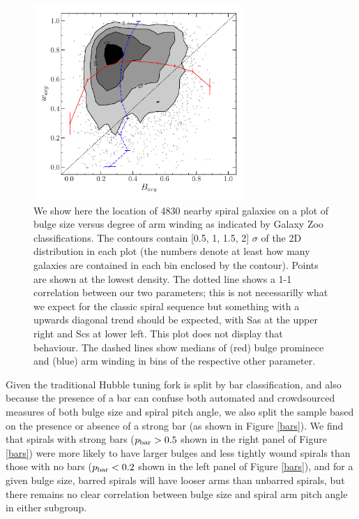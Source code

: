 \documentclass[usenatbib]{mn2e}
\begin{document}
 
 \begin{figure}
\includegraphics[width=80mm]{bulge_armwinding_rolling_median.pdf}
\caption{We show here the location of {4830} nearby spiral galaxies on a plot of bulge size versus degree of arm winding as indicated by Galaxy Zoo classifications. The contours contain [0.5, 1, 1.5, 2] $\sigma$ of the 2D distribution in each plot (the numbers denote at least how many galaxies are contained in each bin enclosed by the contour). Points are shown at the lowest density.  The dotted line shows a 1-1 correlation between our two parameters; this is not necessarilly what we expect for the classic spiral sequence but something with a upwards diagonal trend should be expected, with Sas at the upper right and Scs at lower left. This plot does not display that behaviour. The dashed lines show medians of (red) bulge prominece and (blue) arm winding in bins of the respective other parameter.  \label{bulgewinding}}
\end{figure}
 
 Given the traditional Hubble tuning fork is split by bar classification, and also because the presence of a bar can confuse both automated and crowdsourced measures of both bulge size and spiral pitch angle, we also split the sample based on the presence or absence of a strong bar (as shown in Figure \ref{bars}). We find that spirals with strong bars ($p_{\rm bar}>0.5$ shown in the right panel of Figure \ref{bars}) were more likely to have larger bulges and less tightly wound spirals than those with no bars ($p_{\rm bar} < 0.2$ shown in the left panel of Figure \ref{bars}), and for a given bulge size, barred spirals will have looser arms than unbarred spirals, but there remains no clear correlation between bulge size and spiral arm pitch angle in either subgroup.  
  
\end{document}
